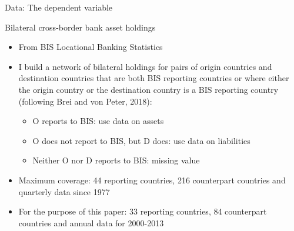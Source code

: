 \documentclass{beamer}
\begin{document}
\begin{frame}{Data: The dependent variable}
\begin{block}{Bilateral cross-border bank asset holdings}
\begin{itemize}
\item From BIS Locational Banking Statistics
\item I build a network of bilateral holdings for pairs of origin countries and destination countries that are both BIS reporting countries or where either the origin country or the destination country is a BIS reporting country (following Brei and von Peter, 2018):
\begin{itemize}
\item O reports to BIS: use data on assets
\item O does not report to BIS, but D does: use data on liabilities
\item Neither O nor D reports to BIS: missing value
\end{itemize}
\item Maximum coverage: 44 reporting countries, 216 counterpart countries and quarterly data since 1977
\item For the purpose of this paper: 33 reporting countries, 84 counterpart countries and annual data for 2000-2013
\end{itemize}
\end{block}
\end{frame}

\end{document}
